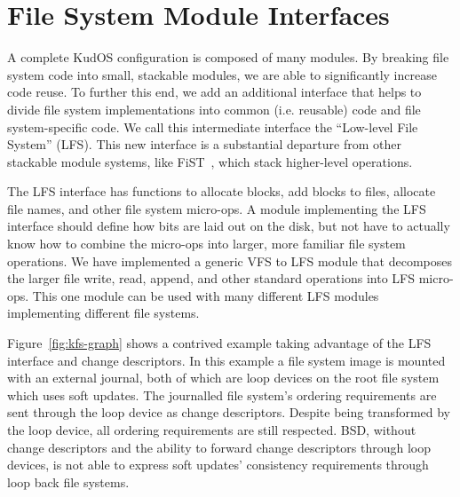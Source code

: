 \preparagraphspacing{}
\section*{File System Module Interfaces}
\label{sec:interfaces}

A complete KudOS configuration is composed of many modules.
By breaking file system code into
small, stackable modules, we are able to significantly increase code reuse. To
further this end, we add an additional interface that helps to divide file system
implementations into common (i.e. reusable) code and file system-specific code.
We call this intermediate interface the ``Low-level File System'' (LFS). This
new interface is a substantial departure from other stackable module systems,
like FiST~\cite{zadok00fist}, which stack higher-level operations.

The LFS interface has functions to allocate blocks, add blocks to
files, allocate file names, and other file system micro-ops. A module
implementing the LFS interface should define how bits are laid out on
the disk, but not have to actually know how to combine the micro-ops
into larger, more familiar file system operations. We have implemented
a generic VFS to LFS module that decomposes the larger file write,
read, append, and other standard operations into LFS micro-ops. This
one module can be used with many different LFS modules implementing
different file systems.

Figure~\ref{fig:kfs-graph} shows a contrived example taking advantage of the LFS
interface and change descriptors. In this example a file system image is mounted
with an external journal, both of which are loop devices on the root file system
which uses soft updates. The journalled file system's ordering requirements are
sent through the loop device as change descriptors. Despite being transformed
by the loop device, all ordering requirements are still respected.
%
BSD, without change descriptors and the ability to forward change
descriptors through loop devices, is not able to express soft updates'
consistency requirements through loop back file systems.
